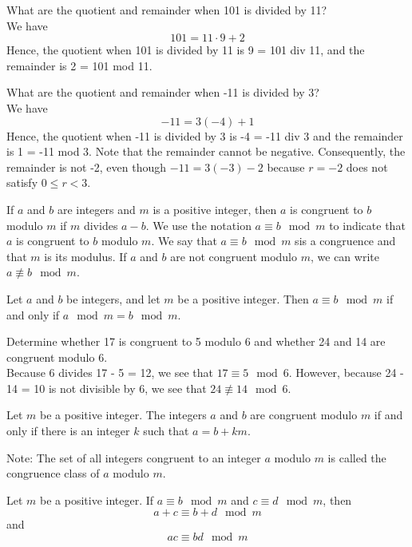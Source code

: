 \documentclass[12pt]{article}
\begin{document}
\begin{example} What are the quotient and remainder when 101 is divided by 11? \\ We have $$101 = 11 \cdot 9 + 2$$ Hence, the quotient when 101 is divided by 11 is 9 = 101 div 11, and the remainder is 2 = 101 mod 11. \end{example} 
\begin{example} What are the quotient and remainder when -11 is divided by 3? \\ We have $$ -11 = 3(-4) + 1$$ Hence, the quotient when -11 is divided by 3 is -4 = -11 div 3 and the remainder is 1 = -11 mod 3. Note that the remainder cannot be negative. Consequently, the remainder is not -2, even though $-11 = 3(-3) - 2$ because $r = -2$ does not satisfy $0 \leq r < 3$. \end{example} 
\begin{definition} If $a$ and $b$ are integers and $m$ is a positive integer, then $a$ is congruent to $b$ modulo $m$ if $m$ divides $a - b$. We use the notation $a \equiv b \mod m$ to indicate that $a$ is congruent to $b$ modulo $m$. We say that $a \equiv b \mod m$ sis a congruence and that $m$ is its modulus. If $a$ and $b$ are not congruent modulo $m$, we can write $a \not\equiv b \mod m$. \end{definition} 
\begin{theorem} Let $a$ and $b$ be integers, and let $m$ be a positive integer. Then $a \equiv b \mod m$ if and only if $a \mod m = b \mod m$. \end{theorem} 
\begin{example} Determine whether 17 is congruent to 5 modulo 6 and whether 24 and 14 are congruent modulo 6. \\ Because 6 divides 17 - 5 = 12, we see that $17 \equiv 5 \mod 6$. However, because 24 - 14 = 10 is not divisible by 6, we see that $24 \not\equiv 14 \mod 6$. \end{example} 
\begin{theorem} Let $m$ be a positive integer. The integers $a$ and $b$ are congruent modulo $m$ if and only if there is an integer $k$ such that $a = b + km$. \end{theorem} 
Note: The set of all integers congruent to an integer $a$ modulo $m$ is called the congruence class of $a$ modulo $m$. 
\begin{theorem} Let $m$ be a positive integer. If $a \equiv b \mod m$ and $c \equiv d \mod m$, then $$ a + c \equiv b + d \mod m$$ and $$ac \equiv bd \mod m$$ \end{theorem} 
\end{document}
